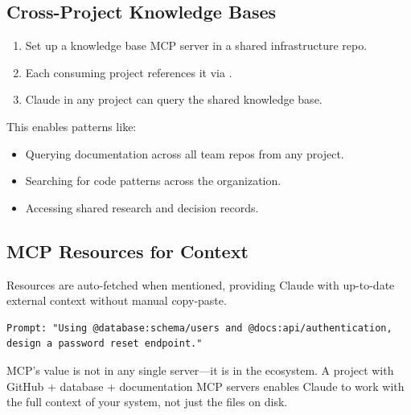 \subsection{Cross-Project Knowledge Bases}


\begin{enumerate}
  \item Set up a knowledge base MCP server in a shared infrastructure repo.
  \item Each consuming project references it via .
  \item Claude in any project can query the shared knowledge base.
\end{enumerate}

This enables patterns like:
\begin{itemize}
  \item Querying documentation across all team repos from any project.
  \item Searching for code patterns across the organization.
  \item Accessing shared research and decision records.
\end{itemize}

\subsection{MCP Resources for Context}

Resources are auto-fetched when mentioned, providing Claude with
up-to-date external context without manual copy-paste.

\begin{verbatim}
Prompt: "Using @database:schema/users and @docs:api/authentication,
design a password reset endpoint."
\end{verbatim}

\begin{keyinsight}
MCP's value is not in any single server---it is in the ecosystem.
A project with GitHub + database + documentation MCP servers enables
Claude to work with the full context of your system, not just the files
on disk.
\end{keyinsight}
